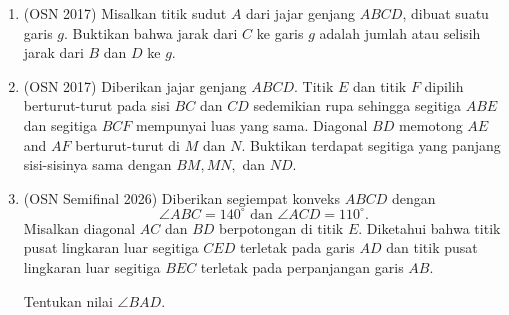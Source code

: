 \documentclass[12pt,a4paper]{article}
\begin{document}
\begin{enumerate}
\item (OSN 2017) Misalkan titik sudut $A$ dari jajar genjang $ABCD$, dibuat suatu garis $g$. Buktikan bahwa jarak dari $C$ ke garis $g$ adalah jumlah atau selisih jarak dari $B$ dan $D$ ke $g$.

\item (OSN 2017) Diberikan jajar genjang $ABCD$. Titik $E$ dan titik $F$ dipilih berturut-turut pada sisi $BC$ dan $CD$ sedemikian rupa sehingga segitiga $ABE$ dan segitiga $BCF$ mempunyai luas yang sama. Diagonal $BD$ memotong $AE$ and $AF$ berturut-turut di $M$ dan $N$. Buktikan terdapat segitiga yang panjang sisi-sisinya sama dengan $BM, MN,$ dan $ND$.

\item (OSN Semifinal 2026) Diberikan segiempat konveks $ABCD$ dengan
$$\angle ABC = 140^{\circ} \text{ dan } \angle ACD = 110^{\circ}.$$
Misalkan diagonal $AC$ dan $BD$ berpotongan di titik $E$. Diketahui bahwa titik pusat lingkaran luar segitiga $CED$ terletak pada garis $AD$ dan titik pusat lingkaran luar segitiga $BEC$ terletak pada perpanjangan garis $AB$.

Tentukan nilai $\angle BAD$.

\end{enumerate}
\end{document}
